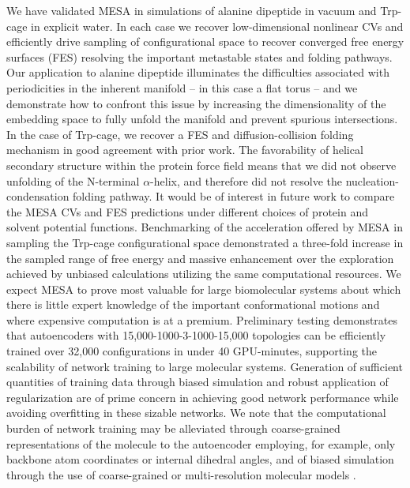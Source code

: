 \documentclass[12pt]{article}
\newcommand*{\groen}[1]{#1}
\newcommand*{\blauwr}[1]{#1}
\begin{document}
We have validated MESA in simulations of alanine dipeptide in vacuum and Trp-cage in explicit water. In each case we recover low-dimensional nonlinear CVs and efficiently drive sampling of configurational space to recover converged free energy surfaces (\groen{FES}) resolving the important metastable states and folding pathways. Our application to alanine dipeptide illuminates the difficulties associated with periodicities in the inherent manifold -- in this case a flat torus -- and we demonstrate how to confront this issue by increasing the dimensionality of the embedding space to fully unfold the manifold and prevent spurious intersections. In the case of Trp-cage, we recover a FES and diffusion-collision folding mechanism in good agreement with prior work. The favorability of helical secondary structure within the protein force field means that we did not observe unfolding of the N-terminal $\alpha$-helix, and therefore did not resolve the nucleation-condensation folding pathway. It would be of interest in future work to compare the MESA CVs and FES predictions under different choices of protein and solvent potential functions. Benchmarking of the acceleration offered by MESA in sampling the Trp-cage configurational space demonstrated a three-fold increase in the sampled range of free energy and massive enhancement over the exploration achieved by unbiased calculations utilizing the same computational resources. We expect MESA to prove most valuable for large biomolecular systems about which there is little expert knowledge of the important conformational motions and where expensive computation is at a premium. \blauwr{Preliminary testing demonstrates that autoencoders with 15,000-1000-3-1000-15,000 topologies can be efficiently trained over 32,000 configurations in under 40 GPU-minutes, supporting the scalability of network training to large molecular systems. Generation of sufficient quantities of training data through biased simulation and robust application of regularization are of prime concern in achieving good network performance while avoiding overfitting in these sizable networks. We note that the computational burden of network training may be alleviated through coarse-grained representations of the molecule to the autoencoder employing, for example, only backbone atom coordinates or internal dihedral angles, and of biased simulation through the use of coarse-grained or multi-resolution molecular models \cite{kmiecik2016coarse}.}
\end{document}
